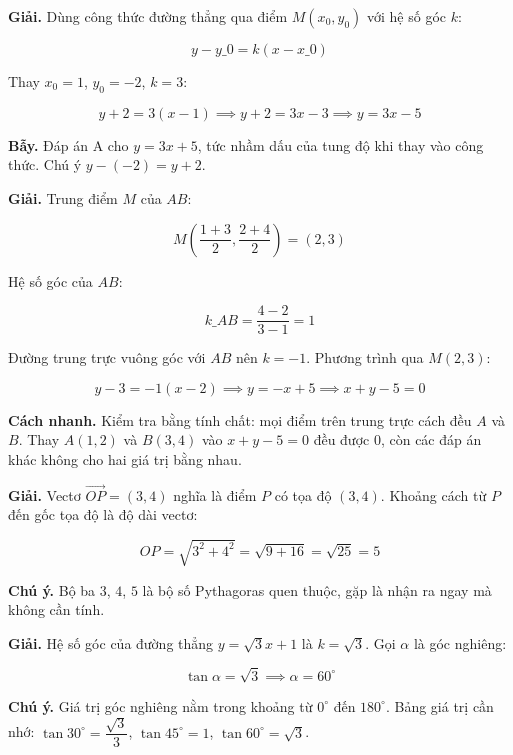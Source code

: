 \documentclass[11pt, a4paper]{article}
\begin{document}
\begin{dapan}[13 — Đáp án D]
\textbf{Giải.} Dùng công thức đường thẳng qua điểm $M(x_0, y_0)$ với hệ số góc $k$:

$$y - y\_0 = k(x - x\_0)$$

Thay $x_0 = 1$, $y_0 = -2$, $k = 3$:

$$y + 2 = 3(x - 1) \implies y + 2 = 3x - 3 \implies y = 3x - 5$$

\textbf{Bẫy.} Đáp án A cho $y = 3x + 5$, tức nhầm dấu của tung độ khi thay vào công thức. Chú ý $y - (-2) = y + 2$.
\end{dapan}

\begin{dapan}[14 — Đáp án A]
\textbf{Giải.} Trung điểm $M$ của $AB$:

$$M\left(\frac{1+3}{2}, \frac{2+4}{2}\right) = (2, 3)$$

Hệ số góc của $AB$:

$$k\_{AB} = \frac{4-2}{3-1} = 1$$

Đường trung trực vuông góc với $AB$ nên $k = -1$. Phương trình qua $M(2, 3)$:

$$y - 3 = -1(x - 2) \implies y = -x + 5 \implies x + y - 5 = 0$$

\textbf{Cách nhanh.} Kiểm tra bằng tính chất: mọi điểm trên trung trực cách đều $A$ và $B$. Thay $A(1,2)$ và $B(3,4)$ vào $x + y - 5 = 0$ đều được $0$, còn các đáp án khác không cho hai giá trị bằng nhau.
\end{dapan}

\begin{dapan}[15 — Đáp án C]
\textbf{Giải.} Vectơ $\overrightarrow{OP} = (3, 4)$ nghĩa là điểm $P$ có tọa độ $(3, 4)$. Khoảng cách từ $P$ đến gốc tọa độ là độ dài vectơ:

$$OP = \sqrt{3^2 + 4^2} = \sqrt{9 + 16} = \sqrt{25} = 5$$

\textbf{Chú ý.} Bộ ba $3$, $4$, $5$ là bộ số Pythagoras quen thuộc, gặp là nhận ra ngay mà không cần tính.
\end{dapan}

\begin{dapan}[16 — Đáp án C]
\textbf{Giải.} Hệ số góc của đường thẳng $y = \sqrt{3}x + 1$ là $k = \sqrt{3}$. Gọi $\alpha$ là góc nghiêng:

$$\tan\alpha = \sqrt{3} \implies \alpha = 60^\circ$$

\textbf{Chú ý.} Giá trị góc nghiêng nằm trong khoảng từ $0^\circ$ đến $180^\circ$. Bảng giá trị cần nhớ: $\tan 30^\circ = \dfrac{\sqrt{3}}{3}$, $\tan 45^\circ = 1$, $\tan 60^\circ = \sqrt{3}$.
\end{dapan}
\end{document}
